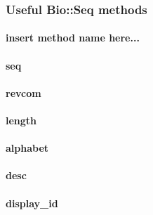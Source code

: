 \subsubsection*{Useful Bio::Seq methods\label{Useful_Bio::Seq_methods}}
\paragraph*{insert method name here...\label{insert_method_name_here_}}
\paragraph*{seq\label{seq}}
\paragraph*{revcom\label{revcom}}
\paragraph*{length\label{length}}
\paragraph*{alphabet\label{alphabet}}
\paragraph*{desc\label{desc}}
\paragraph*{display\_id\label{display_id}}
